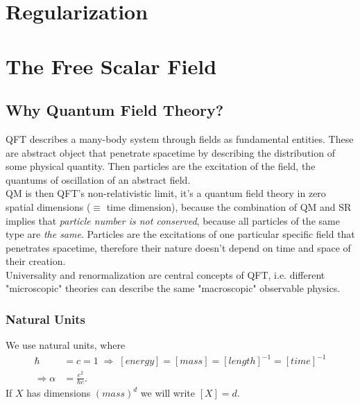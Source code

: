 \section{Regularization}



\section{The Free Scalar Field}
\subsection{Why Quantum Field Theory?}
QFT describes a many-body system through fields as fundamental entities. These are abstract object that penetrate spacetime by describing the distribution of some physical quantity. Then particles are the excitation of the field, the quantums of oscillation of an abstract field.\\
QM is then QFT's non-relativistic limit, it's a quantum field theory in zero spatial dimensions ($\equiv$ time dimension),
because the combination of QM and SR implies that \emph{particle number is not conserved}, because all particles of the same type are \emph{the same}. Particles are the excitations of one particular specific field that penetrates spacetime, therefore their nature doesn't depend on time and space of their creation.\\
Universality and renormalization are central concepts of QFT, i.e. different "microscopic" theories can describe the same "macroscopic" observable physics.
\subsubsection{Natural Units}
We use natural units, where 
\begin{align*}
	\hbar &= c = 1 \; \Rightarrow \; [energy]=[mass]=[length]^{-1}=[time]^{-1} \\
	\Rightarrow \alpha &= \frac{e^2}{\hbar c}.
\end{align*}
If $X$ has dimensions $(mass)^d$ we will write $[X]=d$.
